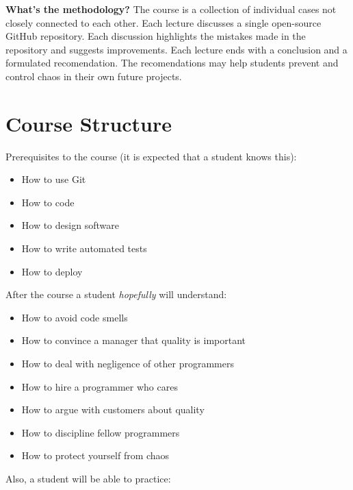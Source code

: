 \documentclass[nobrand,anonymous,nodate,nosecurity]{huawei}
\begin{document}
{\textbf{What's the methodology?}
The course is a collection of individual cases not
closely connected to each other. Each lecture discusses a single open-source
GitHub repository. Each discussion highlights the mistakes made in the
repository and suggests improvements. Each lecture ends with a conclusion
and a formulated recomendation. The recomendations may help students
prevent and control chaos in their own future projects.

\newpage
\section*{Course Structure}

Prerequisites to the course (it is expected that a student knows this):

\begin{itemize}
\item How to use Git
\item How to code
\item How to design software
\item How to write automated tests
\item How to deploy
\end{itemize}

After the course a student \emph{hopefully} will understand:

\begin{itemize}
\item How to avoid code smells
\item How to convince a manager that quality is important
\item How to deal with negligence of other programmers
\item How to hire a programmer who cares
\item How to argue with customers about quality
\item How to discipline fellow programmers
\item How to protect yourself from chaos
\end{itemize}

Also, a student will be able to practice:

}
\end{document}
